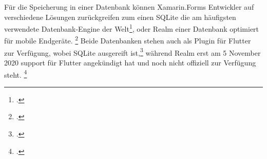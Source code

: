 Für die Speicherung in einer Datenbank können Xamarin.Forms Entwickler auf verschiedene Lösungen zurückgreifen zum einen SQLite die am häufigsten verwendete Datenbank-Engine der Welt\footcite[Vgl.][Abgerufen am \today]{SQLiteConsortium2020},  oder Realm einer Datenbank optimiert für mobile Endgeräte. \footcite[Vgl.][Abgerufen am \today]{MongoDBRealm2020} Beide Datenbanken stehen auch als Plugin für Flutter zur Verfügung, wobei SQLite ausgereift ist,\footcite[Vgl.][Abgerufen am \today]{Tekartik2020} während Realm erst am 5 November 2020 support für Flutter angekündigt hat und noch nicht offiziell zur Verfügung steht. \footcite[Vgl.][Abgerufen am \today]{MongoDBFlutterSupport2020}
